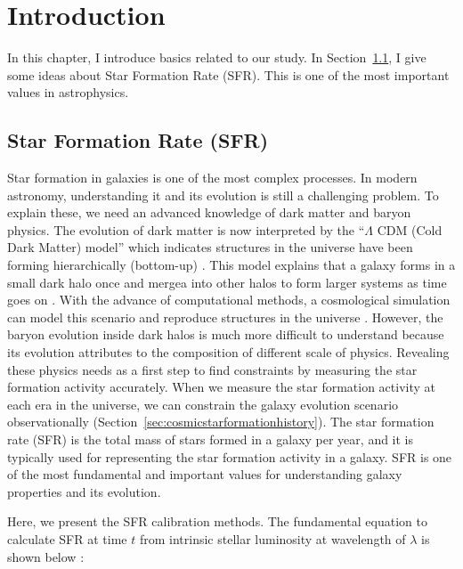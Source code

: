 \chapter{Introduction}\label{chap:introduction}
\begin{chapabstract}

In this chapter, I introduce basics related to our study.
In Section~\ref{sec:starformationrate}, I give some ideas about Star Formation Rate (SFR).
This is one of the most important values in astrophysics.

\end{chapabstract}

\section{Star Formation Rate (SFR)}\label{sec:starformationrate}

Star formation in galaxies is one of the most complex processes.
In modern astronomy, understanding it and its evolution is still a challenging problem.
To explain these, we need an advanced knowledge of dark matter and baryon physics.
The evolution of dark matter is now interpreted by the ``$\Lambda$ CDM (Cold Dark Matter) model'' which indicates structures in the universe have been forming hierarchically (bottom-up) \citep[e.g.,][]{Peebles1982}.
This model explains that a galaxy forms in a small dark halo once and mergea into other halos to form larger systems as time goes on \citep{Blumenthal1984}.
With the advance of computational methods, a cosmological simulation can model this scenario and reproduce structures in the universe \citep[e.g.,][]{Navarro2000, Vale2004}.
However, the baryon evolution inside dark halos is much more difficult to understand because its evolution attributes to the composition of different scale of physics.
Revealing these physics needs as a first step to find constraints by measuring the star formation activity accurately.
When we measure the star formation activity at each era in the universe, we can constrain the galaxy evolution scenario observationally (Section~\ref{sec:cosmicstarformationhistory}).
The star formation rate (SFR) is the total mass of stars formed in a galaxy per year, and it is typically used for representing the star formation activity in a galaxy.
SFR is one of the most fundamental and important values for understanding galaxy properties and its evolution.

Here, we present the SFR calibration methods.
The fundamental equation to calculate SFR at time $t$ from intrinsic stellar luminosity at wavelength of $\lambda$ is shown below \citep{Buat1991}:

